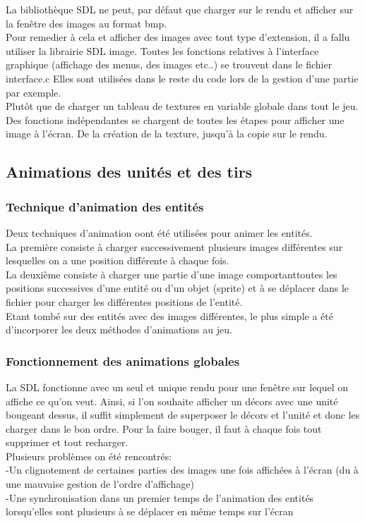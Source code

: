 \documentclass[a4paper,11pt]{article}
\begin{document}
La bibliothèque SDL ne peut, par défaut que charger sur le rendu et afficher sur la fenêtre des images au format bmp.\\
Pour remedier à cela et afficher des images avec tout type d'extension, il a fallu utiliser la librairie SDL image.
Toutes les fonctions relatives à l'interface graphique (affichage des menus, des images etc..) se trouvent dans le fichier interface.c
Elles sont utilisées dans le reste du code lors de la gestion d'une partie par exemple.\\
Plutôt que de charger un tableau de textures en variable globale dans tout le jeu. Des fonctions indépendantes se chargent
de toutes les étapes pour afficher une image à l'écran. De la création de la texture, jusqu'à la copie sur le rendu.
\subsection{Animations des unités et des tirs}
\subsubsection{Technique d'animation des entités}
Deux techniques d'animation oont été utilisées pour animer les entités.\\ La première consiste à charger successivement plusieurs images différentes
sur lesquelles on a une position différente à chaque fois.\\ La deuxième consiste à charger une partie d'une image comportanttoutes les positions successives
d'une entité ou d'un objet (sprite) et à se déplacer dans le fichier pour charger les
différentes positions de l'entité.\\ Etant tombé sur des entités avec des images différentes, le plus simple a été d'incorporer les deux méthodes
d'animations au jeu.
\subsubsection{Fonctionnement des animations globales}
La SDL fonctionne avec un seul et unique rendu pour une fenêtre sur lequel on affiche ce qu'on veut. Ainsi, 
si l'on souhaite afficher un décors avec une unité bougeant dessus, il suffit simplement de superposer le décors et l'unité 
et donc les charger dans le bon ordre. Pour la faire bouger, il faut à chaque fois tout supprimer et tout recharger. \\
Plusieurs problèmes on été rencontrés:\\
-Un clignotement de certaines parties des images une fois affichées à l'écran (du à une mauvaise gestion de l'ordre d'affichage)\\
-Une synchronisation dans un premier temps de l'animation des entités lorsqu'elles sont plusieurs à se déplacer en même temps sur l'écran\\\\
\end{document}
